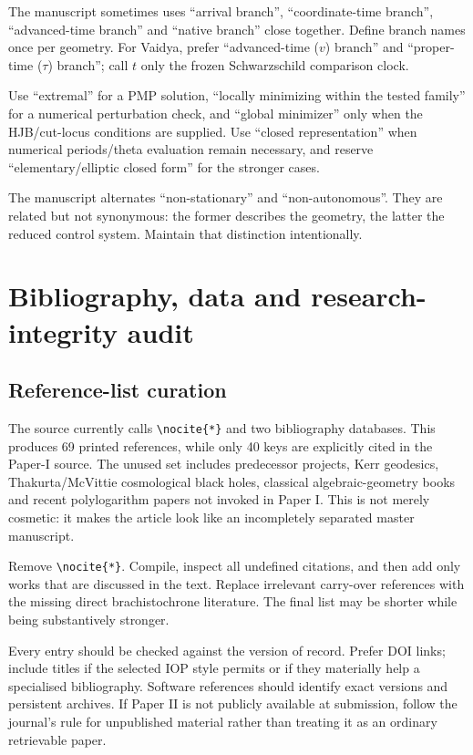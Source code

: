 \documentclass[11pt,a4paper]{article}
\begin{document}
The manuscript sometimes uses ``arrival branch'', ``coordinate-time branch'', ``advanced-time
branch'' and ``native branch'' close together.  Define branch names once per geometry.  For Vaidya,
prefer ``advanced-time ($v$) branch'' and ``proper-time ($\tau$) branch''; call $t$ only the frozen
Schwarzschild comparison clock.

Use ``extremal'' for a PMP solution, ``locally minimizing within the tested family'' for a numerical
perturbation check, and ``global minimizer'' only when the HJB/cut-locus conditions are supplied.
Use ``closed representation'' when numerical periods/theta evaluation remain necessary, and
reserve ``elementary/elliptic closed form'' for the stronger cases.

The manuscript alternates ``non-stationary'' and ``non-autonomous''.  They are related but not
synonymous: the former describes the geometry, the latter the reduced control system.  Maintain
that distinction intentionally.

\section{Bibliography, data and research-integrity audit}

\subsection{Reference-list curation}

The source currently calls \verb|\nocite{*}| and two bibliography databases.  This produces 69
printed references, while only 40 keys are explicitly cited in the Paper-I source.  The unused set
includes predecessor projects, Kerr geodesics, Thakurta/McVittie cosmological black holes,
classical algebraic-geometry books and recent polylogarithm papers not invoked in Paper I.  This is
not merely cosmetic: it makes the article look like an incompletely separated master manuscript.

Remove \verb|\nocite{*}|.  Compile, inspect all undefined citations, and then add only works that
are discussed in the text.  Replace irrelevant carry-over references with the missing direct
brachistochrone literature.  The final list may be shorter while being substantively stronger.

Every entry should be checked against the version of record.  Prefer DOI links; include titles if
the selected IOP style permits or if they materially help a specialised bibliography.  Software
references should identify exact versions and persistent archives.  If Paper II is not publicly
available at submission, follow the journal's rule for unpublished material rather than treating
it as an ordinary retrievable paper.
\end{document}
